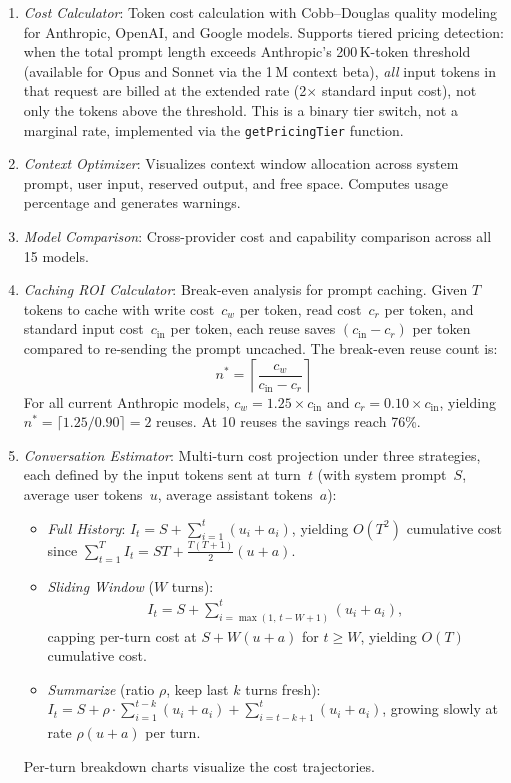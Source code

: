 \documentclass[a4paper,fleqn]{cas-dc}
\begin{document}
\begin{enumerate}
  \item \textit{Cost Calculator}: Token cost calculation with Cobb--Douglas quality modeling for Anthropic, OpenAI, and Google models. Supports tiered pricing detection: when the total prompt length exceeds Anthropic's 200\,K-token threshold (available for Opus and Sonnet via the 1\,M context beta), \emph{all} input tokens in that request are billed at the extended rate (2$\times$ standard input cost), not only the tokens above the threshold. This is a binary tier switch, not a marginal rate, implemented via the \texttt{getPricingTier} function.

  \item \textit{Context Optimizer}: Visualizes context window allocation across system prompt, user input, reserved output, and free space. Computes usage percentage and generates warnings.

  \item \textit{Model Comparison}: Cross-provider cost and capability comparison across all 15 models.

  \item \textit{Caching ROI Calculator}: Break-even analysis for prompt caching. Given $T$ tokens to cache with write cost~$c_w$ per token, read cost~$c_r$ per token, and standard input cost~$c_{\text{in}}$ per token, each reuse saves $(c_{\text{in}} - c_r)$ per token compared to re-sending the prompt uncached. The break-even reuse count is:
  \begin{equation}
    n^* = \left\lceil \frac{c_w}{c_{\text{in}} - c_r} \right\rceil
  \end{equation}
  For all current Anthropic models, $c_w = 1.25 \times c_{\text{in}}$ and $c_r = 0.10 \times c_{\text{in}}$, yielding $n^* = \lceil 1.25 / 0.90 \rceil = 2$ reuses. At 10 reuses the savings reach 76\%.

  \item \textit{Conversation Estimator}: Multi-turn cost projection under three strategies, each defined by the input tokens sent at turn~$t$ (with system prompt~$S$, average user tokens~$u$, average assistant tokens~$a$):
  \begin{itemize}
    \item \textit{Full History}: $I_t = S + \sum_{i=1}^{t}(u_i + a_i)$, yielding $O(T^2)$ cumulative cost since $\sum_{t=1}^{T} I_t = ST + \tfrac{T(T+1)}{2}(u+a)$.
    \item \textit{Sliding Window} ($W$ turns): \begin{equation*}
    \begin{aligned}
    I_t = S + \sum_{i=\max(1,\,t-W+1)}^{t} 
          (u_i + a_i),
    \end{aligned}
    \end{equation*} capping per-turn cost at $S + W(u+a)$ for $t \geq W$, yielding $O(T)$ cumulative cost.
    \item \textit{Summarize} (ratio $\rho$, keep last $k$ turns fresh): $I_t = S + \rho \cdot \sum_{i=1}^{t-k}(u_i + a_i) + \sum_{i=t-k+1}^{t}(u_i + a_i)$, growing slowly at rate $\rho(u+a)$ per turn.
  \end{itemize}
  Per-turn breakdown charts visualize the cost trajectories.


\end{enumerate}
\end{document}

